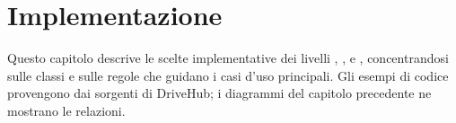 \chapter{Implementazione}\label{ch:implementazione}
Questo capitolo descrive le scelte implementative dei livelli , ,  e , concentrandosi sulle classi e sulle regole che guidano i casi d'uso principali. Gli esempi di codice provengono dai sorgenti di DriveHub; i diagrammi del capitolo precedente ne mostrano le relazioni.









